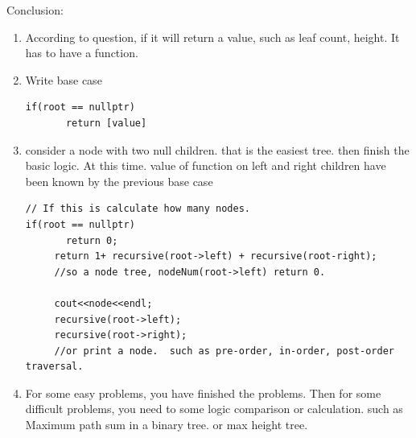 \documentclass[a4paper,12pt,twoside]{book}
\begin{document}
Conclusion:
\begin{enumerate}
\item According to question, if it will return a value, such as leaf count, height. It has to have a function. 
\item Write base case 
\begin{lstlisting}[breaklines]
if(root == nullptr) 
       return [value] 
\end{lstlisting}
\item consider a node with two null children. that is the easiest tree. then finish the basic logic. At this time. value of function on left and right children have been known by the previous base case
\begin{lstlisting}[breaklines]
// If this is calculate how many nodes.
if(root == nullptr) 
       return 0;
     return 1+ recursive(root->left) + recursive(root-right);
     //so a node tree, nodeNum(root->left) return 0. 
     
     cout<<node<<endl;
     recursive(root->left);
     recursive(root->right);     
     //or print a node.  such as pre-order, in-order, post-order traversal. 
\end{lstlisting}

\item For some easy problems, you have finished the problems. Then for some difficult problems, you need to some logic comparison or calculation. such as Maximum path sum in a binary tree. or max height tree.



\end{enumerate}
\end{document}

